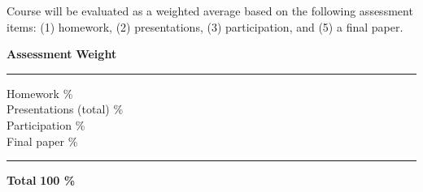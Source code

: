 


Course will be evaluated as a weighted average based on the following assessment items: (1) homework, (2) presentations, (3) participation, and (5) a final paper. 


\begin{flushleft}
\textbf{Assessment} \hfill \textbf{Weight} \\
\vspace{.1in}

 \hrule 
 \vspace{.1in}


Homework \% \\

Presentations (total) \%\\

Participation \% \\

Final paper \%\\
\vspace{.1in}

 \hrule 
 \vspace{.1in}
\textbf{Total} \hfill \textbf{100 \%}
 \end{flushleft}


